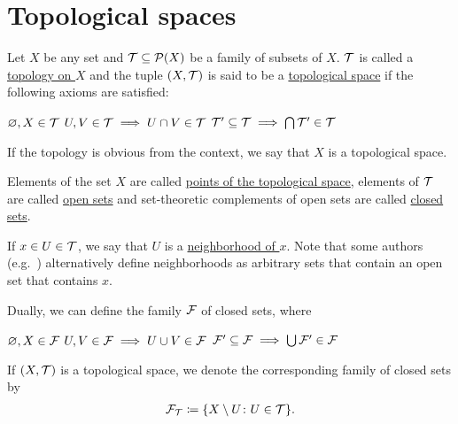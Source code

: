 \section{Topological spaces}\label{sec:topological_spaces}

\begin{definition}\label{def:topological_space}\cite[11]{Engelking1989}
  Let $X$ be any set and $\mathcal T \subseteq \operatorname{\mathcal P}(X)$ be a family of subsets of $X$. $\mathcal T$ is called a \ul{topology on $X$} and the tuple $(X, \mathcal T)$ is said to be a \ul{topological space} if the following axioms are satisfied:
  \begin{description}
     $\varnothing, X \in \mathcal T$
     $U, V \in \mathcal T \implies U \cap V \in \mathcal T$
     $\mathcal T' \subseteq \mathcal T \implies \bigcap \mathcal T' \in \mathcal T$
  \end{description}

  If the topology is obvious from the context, we say that $X$ is a topological space.

  Elements of the set $X$ are called \ul{points of the topological space}, elements of $\mathcal T$ are called \ul{open sets} and set-theoretic complements of open sets are called \ul{closed sets}.

  If $x \in U \in \mathcal T$, we say that $U$ is a \ul{neighborhood of $x$}. Note that some authors (e.g.~\cite[38]{Kelley1955}) alternatively define neighborhoods as arbitrary sets that contain an open set that contains $x$.

  Dually, we can define the family $\mathcal F$ of closed sets, where
  \begin{description}
     $\varnothing, X \in \mathcal F$
     $U, V \in \mathcal F \implies U \cup V \in \mathcal F$
     $\mathcal F' \subseteq \mathcal F \implies \bigcup \mathcal F' \in \mathcal F$
  \end{description}

  If $(X, \mathcal T)$ is a topological space, we denote the corresponding family of closed sets by
  \begin{align*}
    \mathcal F_{\mathcal T} \coloneqq \{ X \setminus U \colon U \in \mathcal T \}.
  \end{align*}
\end{definition}


